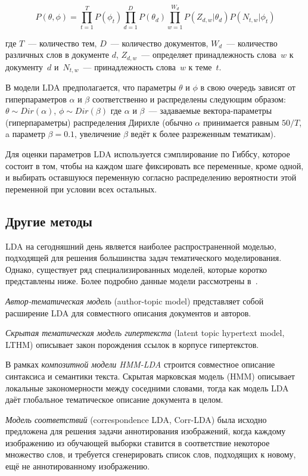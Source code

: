 \begin{equation}\label{eq:lda}
P(\theta, \phi)=\prod_{t=1}^{T}P(\phi_t)\prod_{d=1}^{D}P(\theta_d)\prod_{w=1}^{W_d}P(Z_{d,w}|\theta_d)P(N_{t,w}|\phi_t)
\end{equation}

где $T$~--- количество тем, $D$~--- количество документов, $W_d$~--- количество различных слов в документе $d$, $Z_{d,w}$~--- определяет принадлежность слова~$w$ к документу~$d$ и~$N_{t,w}$~--- принадлежность слова~$w$ к теме~$t$.

В модели LDA предполагается, что параметры $\theta$ и $\phi$ в свою очередь зависят от гиперпараметров $\alpha$ и $\beta$ соответственно и распределены следующим образом:~$\theta\sim Dir(\alpha)$, $\phi\sim Dir(\beta)$ где $\alpha$ и $\beta$~--- задаваемые вектора-параметры (гиперпараметры) распределения Дирихле (обычно $\alpha$ принимается равным $50/T$, a параметр $\beta=0.1$, увеличение $\beta$ ведёт к более разреженным тематикам).

Для оценки параметров LDA используется сэмплирование по Гиббсу, которое состоит в том, чтобы на каждом шаге фиксировать все переменные, кроме одной, и выбирать оставшуюся переменную согласно распределению вероятности этой переменной при условии всех остальных.

\subsection{Другие методы}

LDA на сегодняшний день является наиболее распространенной моделью, подходящей для решения большинства задач тематического моделирования. Однако, существует ряд специализированных моделей, которые коротко представлены ниже. Более подробно данные модели рассмотрены в~\cite{TM}.

\textit{Автор-тематическая модель} (author-topic model) представляет собой расширение LDA для совместного описания документов и авторов.

\textit{Скрытая тематическая модель гипертекста} (latent topic hypertext model, LTHM) описывает закон порождения ссылок в корпусе гипертекстов.

В рамках \textit{композитной модели HMM-LDA} строится совместное описание синтаксиса и семантики текста. Скрытая марковская модель (HMM) описывает локальные закономерности между соседними словами, тогда как модель LDA даёт глобальное тематическое описание документа в целом.

\textit{Модель соответствий} (correspondence LDA, Corr-LDA) была исходно предложена для решения задачи аннотирования изображений, когда каждому изображению из обучающей выборки ставится в соответствие некоторое множество слов, и требуется сгенерировать список слов, подходящих к новому, ещё не аннотированному изображению.

